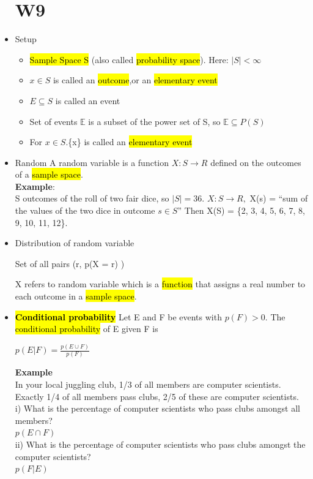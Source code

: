 \documentclass{article}
\begin{document}
\begin{itemize}
\section{W9}
\item Setup
\begin{itemize}
\item \hl{Sample Space S} (also called \hl{probability space}). Here: $|S| < \infty $ 
\item $x \in S$ is called an \hl{outcome},or an \hl{elementary event}
\item $E \subseteq S$ is called an event
\item Set of events $\mathbb{E}$ is a subset of the power set of S, so $\mathbb{E} \subseteq P(S)$
\item For $x \in S$.\{x\} is called an \hl{elementary event}
\end{itemize}

\item Random A random variable is a function $X : S \rightarrow R$ defined on the outcomes of a
\hl{sample space}.\\
\textbf{Example}:\\S outcomes of the roll of two fair dice, so $|S| = 36$.
$X : S \rightarrow R,$ X(s) = “sum of the values of the two dice in outcome $s \in S$”
Then X(S) = \{2, 3, 4, 5, 6, 7, 8, 9, 10, 11, 12\}.

\item Distribution of random variable
\begin{center}
Set of all pairs (r, p(X = r) )
\end{center}
X refers to random variable which is a \hl{function} that assigns a real number to each outcome in a \hl{sample space}.

\item \textbf{\hl{Conditional probability}}
Let E and F be events with $p(F) > 0.$
The \hl{conditional probability} of E given F is
\begin{center}
$p(E | F) = \frac{p(E \cup F)}{p(F)}$
\end{center}

\textbf{Example}\\
In your local juggling club, 1/3
of all members are computer scientists.
Exactly 1/4 of all members pass clubs, 2/5
of these are computer scientists.\\
i) What is the percentage of computer scientists who pass clubs
amongst all members?\\
$p(E \cap F)$\\
ii) What is the percentage of computer scientists who pass clubs
amongst the computer scientists?\\
$p(F | E)$


\end{itemize}
\end{document}
